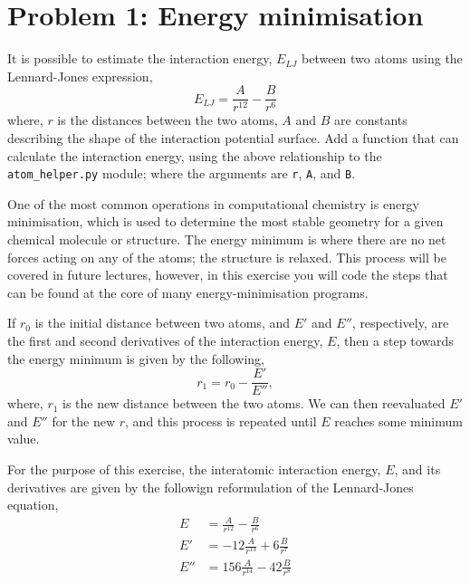 \documentclass[a4paper]{article}
\begin{document}
\section{Problem 1: Energy minimisation}

It is possible to estimate the interaction energy, $E_{LJ}$ between two atoms using the Lennard-Jones expression,
\begin{equation}
  E_{LJ} = \frac{A}{r^{12}} - \frac{B}{r^6}
\end{equation}
where, $r$ is the distances between the two atoms, $A$ and $B$ are constants describing the shape of the interaction potential surface.
Add a function that can calculate the interaction energy, using the above relationship to the \texttt{atom\_helper.py} module; where the arguments are \texttt{r}, \texttt{A}, and \texttt{B}.

One of the most common operations in computational chemistry is energy minimisation, which is used to determine the most stable geometry for a given chemical molecule or structure.
The energy minimum is where there are no net forces acting on any of the atoms; the structure is relaxed.
This process will be covered in future lectures, however, in this exercise you will code the steps that can be found at the core of many energy-minimisation programs.

If $r_0$ is the initial distance between two atoms, and $E'$ and $E''$, respectively, are the first and second derivatives of the interaction energy, $E$, then a step towards the energy minimum is given by the following,
\begin{equation}
  r_1 = r_0 - \frac{E'}{E''},
\end{equation}
where, $r_1$ is the new distance between the two atoms.
We can then reevaluated $E'$ and $E''$ for the new $r$, and this process is repeated until $E$ reaches some minimum value.

For the purpose of this exercise, the interatomic interaction energy, $E$, and its derivatives are given by the followign reformulation of the Lennard-Jones equation,
\begin{equation}
  \begin{aligned}
    E & = \frac{A}{r^{12}} - \frac{B}{r^6} \\
    E' & = -12\frac{A}{r^{13}} + 6\frac{B}{r^7} \\
    E'' & = 156\frac{A}{r^{14}} - 42\frac{B}{r^8} \\
  \end{aligned}
\end{equation}
\end{document}
